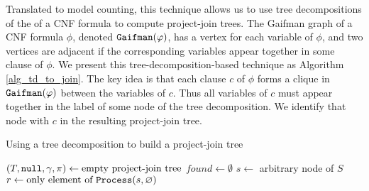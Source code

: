 Translated to model counting, this technique allows us to use tree decompositions of the  of a CNF formula to compute project-join trees.
The Gaifman graph of a CNF formula $\phi$, denoted $\texttt{\upshape Gaifman}(\varphi)$, has a vertex for each variable of $\phi$, and two vertices are adjacent if the corresponding variables appear together in some clause of $\phi$.
We present this tree-decomposition-based technique as Algorithm \ref{alg_td_to_join}.
The key idea is that each clause $c$ of $\phi$ forms a clique in $\texttt{\upshape Gaifman}(\varphi)$ between the variables of $c$.
Thus all variables of $c$ must appear together in the label of some node of the tree decomposition.
We identify that node with $c$ in the resulting project-join tree.
\begin{algorithm*}[t]
\label{alg_td_to_join}
\caption{Using a tree decomposition to build a project-join tree}
    \DontPrintSemicolon
    $(T, \texttt{\upshape null}, \gamma, \pi) \gets \text{empty project-join tree}$\;
    $found \gets \emptyset$
    $s \gets$ arbitrary node of $S$ \label{line_arbitrary_node}
    $r \gets \text{only element of}~\texttt{\upshape Process}(s, \varnothing)$\;
\end{algorithm*}

